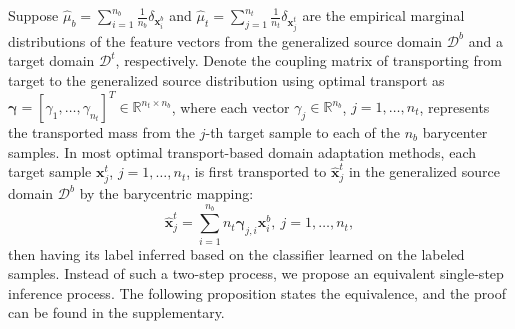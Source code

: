 \documentclass[journal]{IEEEtran}
\begin{document}
Suppose $\widehat{\mu}_{b}=\sum_{i=1}^{n_{b}}\frac{1}{n_{b}} \delta_{\boldsymbol{x}_i^{b}}$ and $\widehat{\mu}_{t}=\sum_{j=1}^{n_t}\frac{1}{n_t} \delta_{\boldsymbol{x}_j^{t}}$ are the empirical marginal distributions of the feature vectors from the generalized source domain $\mathcal{D}^{b}$ and a target domain $\mathcal{D}^t$, respectively.
Denote the coupling matrix of transporting from target to the generalized source distribution using optimal transport \cite{courty2016optimal}
as $\boldsymbol{\gamma}=[{\gamma}_1,\ldots,{\gamma}_{n_t}]^T\in\mathbb{R}^{n_t \times n_b}$, where each vector ${\gamma}_{j}\in\mathbb{R}^{n_b}$, $j=1,\ldots,n_t$, represents the transported mass from
the $j$-th target sample to each of the $n_b$ barycenter samples.
In most optimal transport-based domain adaptation methods, each target sample $\boldsymbol{x}_j^{t}$, $j=1,\ldots, n_t$, is first transported to $\widehat{\boldsymbol{x}}_j^{t}$ in the generalized source domain $\mathcal{D}^{b}$ by the barycentric mapping:
\begin{equation}
    \widehat{\boldsymbol{x}}_j^{t}=\sum_{i=1}^{n_b}n_t {\boldsymbol{\gamma}}_{j,i}{\boldsymbol{x}_i^{b}}, \ j=1,\ldots, n_t,\label{barycentric_mapping}
\end{equation}
then having its label inferred based on the classifier learned on the labeled samples.
Instead of such a two-step process, we propose an equivalent single-step inference process. The following proposition states the equivalence,
and the proof can be found in the supplementary.
\end{document}
